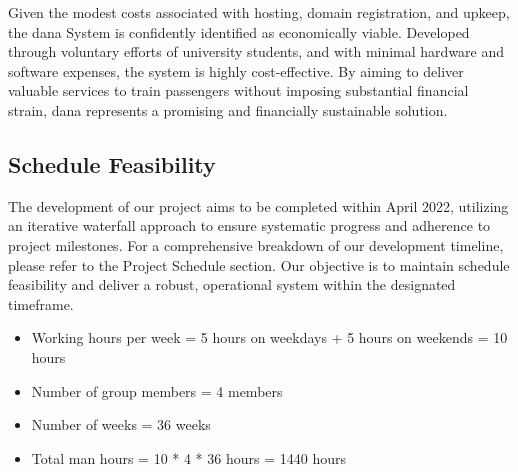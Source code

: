 Given the modest costs associated with hosting, domain registration, and upkeep, the dana System is confidently identified as economically viable. Developed through voluntary efforts of university students, and with minimal hardware and software expenses, the system is highly cost-effective. By aiming to deliver valuable services to train passengers without imposing substantial financial strain, dana represents a promising and financially sustainable solution.

\subsection{Schedule Feasibility}
The development of our project aims to be completed within April 2022, utilizing an iterative waterfall approach to ensure systematic progress and adherence to project milestones. For a comprehensive breakdown of our development timeline, please refer to the Project Schedule section. Our objective is to maintain schedule feasibility and deliver a robust, operational system within the designated timeframe.
\begin{itemize}[label={}]
\itemsep0em 
\item Working hours per week =  5 hours on weekdays + 5 hours on weekends = 10 hours
\item Number of group members = 4 members 
\item Number of weeks = 36 weeks
\item Total man hours = 10 * 4 * 36 hours = 1440 hours 
\end{itemize}


